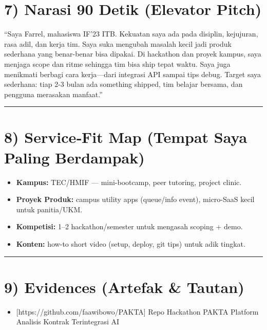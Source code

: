 \documentclass[
  letterpaper,
  DIV=11,
  numbers=noendperiod]{scrreprt}
\providecommand{\tightlist}{%
  \setlength{\itemsep}{0pt}\setlength{\parskip}{0pt}}
\begin{document}
\section{7) Narasi 90 Detik (Elevator
Pitch)}\label{narasi-90-detik-elevator-pitch}

``Saya Farrel, mahasiswa IF'23 ITB. Kekuatan saya ada pada disiplin,
kejujuran, rasa adil, dan kerja tim. Saya suka mengubah masalah kecil
jadi produk sederhana yang benar-benar bisa dipakai. Di hackathon dan
proyek kampus, saya menjaga scope dan ritme sehingga tim bisa ship tepat
waktu. Saya juga menikmati berbagi cara kerja---dari integrasi API
sampai tips debug. Target saya sederhana: tiap 2-3 bulan ada something
shipped, tim belajar bersama, dan pengguna merasakan manfaat.''

\begin{center}\rule{0.5\linewidth}{0.5pt}\end{center}

\section{8) Service‑Fit Map (Tempat Saya Paling
Berdampak)}\label{servicefit-map-tempat-saya-paling-berdampak}

\begin{itemize}
\tightlist
\item
  \textbf{Kampus:} TEC/HMIF --- mini-bootcamp, peer tutoring, project
  clinic.
\item
  \textbf{Proyek Produk:} campus utility apps (queue/info event),
  micro-SaaS kecil untuk panitia/UKM.
\item
  \textbf{Kompetisi:} 1--2 hackathon/semester untuk mengasah scoping +
  demo.
\item
  \textbf{Konten:} how-to short video (setup, deploy, git tips) untuk
  adik tingkat.
\end{itemize}

\begin{center}\rule{0.5\linewidth}{0.5pt}\end{center}

\section{9) Evidences (Artefak \&
Tautan)}\label{evidences-artefak-tautan}

\begin{itemize}
\tightlist
\item
  {[}https://github.com/faawibowo/PAKTA{]} Repo Hackathon PAKTA Platform
  Analisis Kontrak Terintegrasi AI
\end{itemize}
\end{document}
